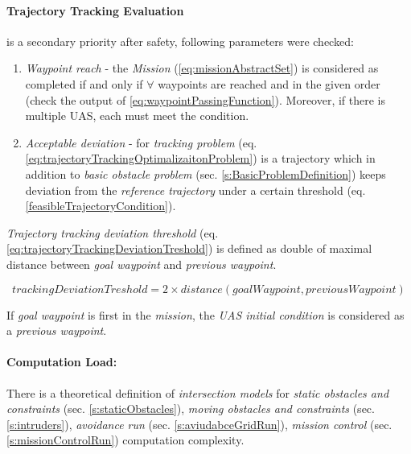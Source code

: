 \paragraph{Trajectory Tracking Evaluation} is a secondary priority after safety, following parameters were checked:

\begin{enumerate}
    \item \emph{Waypoint reach} - the \emph{Mission} (\ref{eq:missionAbstractSet}) is considered as completed if and only if $\forall$ waypoints are reached and in the given order (check the  output of \ref{eq:waypointPassingFunction}). Moreover, if there is multiple UAS, each must meet the condition.
    
    \item \emph{Acceptable deviation} - for \emph{tracking problem} (eq. \ref{eq:trajectoryTrackingOptimalizaitonProblem}) is a trajectory which in addition to \emph{basic obstacle problem} (sec. \ref{s:BasicProblemDefinition}) keeps deviation from the \emph{reference trajectory} under a certain threshold (eq. \ref{feasibleTrajectoryCondition}). 
\end{enumerate}

\noindent\emph{Trajectory tracking deviation threshold} (eq. \ref{eq:trajectoryTrackingDeviationTreshold}) is defined as double of maximal distance between \emph{goal waypoint} and \emph{previous waypoint}. 

\begin{equation}\label{eq:trajectoryTrackingDeviationTreshold}
        trackingDeviationTreshold =  2 \times distance (goalWaypoint,previousWaypoint)
\end{equation}

\begin{note}
    If \emph{goal waypoint} is first in the \emph{mission}, the \emph{UAS initial condition} is considered as a \emph{previous waypoint}.
\end{note}

\paragraph{Computation Load:} There is a theoretical definition of \emph{intersection models} for \emph{static obstacles and constraints} (sec. \ref{s:staticObstacles}), \emph{moving obstacles and constraints} (sec. \ref{s:intruders}), \emph{avoidance run} (sec. \ref{s:aviudabceGridRun}), \emph{mission control} (sec. \ref{s:missionControlRun}) computation complexity.

